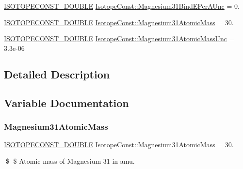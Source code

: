 \begin{DoxyCompactItemize}
\mbox{\hyperlink{group___isotope_const-_macros_ga8f45a7272ce02c0b4c65c44636ed719a}{I\+S\+O\+T\+O\+P\+E\+C\+O\+N\+S\+T\+\_\+\+D\+O\+U\+B\+LE}} \mbox{\hyperlink{group___isotope_const-_magnesium-_mg31_gab2dbe145fb67a4a8c97e870c14deaab0}{Isotope\+Const\+::\+Magnesium31\+Bind\+E\+Per\+A\+Unc}} = 0.
\item 
\mbox{\hyperlink{group___isotope_const-_macros_ga8f45a7272ce02c0b4c65c44636ed719a}{I\+S\+O\+T\+O\+P\+E\+C\+O\+N\+S\+T\+\_\+\+D\+O\+U\+B\+LE}} \mbox{\hyperlink{group___isotope_const-_magnesium-_mg31_ga4aa10e9156cad22509d212337759b763}{Isotope\+Const\+::\+Magnesium31\+Atomic\+Mass}} = 30.
\item 
\mbox{\hyperlink{group___isotope_const-_macros_ga8f45a7272ce02c0b4c65c44636ed719a}{I\+S\+O\+T\+O\+P\+E\+C\+O\+N\+S\+T\+\_\+\+D\+O\+U\+B\+LE}} \mbox{\hyperlink{group___isotope_const-_magnesium-_mg31_ga336638ed01191a0f17a79ea0da5c3f1e}{Isotope\+Const\+::\+Magnesium31\+Atomic\+Mass\+Unc}} = 3.\+3e-\/06
\end{DoxyCompactItemize}


\subsection{Detailed Description}


\subsection{Variable Documentation}
\mbox{\label{group___isotope_const-_magnesium-_mg31_ga4aa10e9156cad22509d212337759b763}} 
\subsubsection{\texorpdfstring{Magnesium31\+Atomic\+Mass}{Magnesium31AtomicMass}}
{\footnotesize\ttfamily \mbox{\hyperlink{group___isotope_const-_macros_ga8f45a7272ce02c0b4c65c44636ed719a}{I\+S\+O\+T\+O\+P\+E\+C\+O\+N\+S\+T\+\_\+\+D\+O\+U\+B\+LE}} Isotope\+Const\+::\+Magnesium31\+Atomic\+Mass = 30.}

\$ \$ Atomic mass of Magnesium-\/31 in amu. \mbox{\label{group___isotope_const-_magnesium-_mg31_ga336638ed01191a0f17a79ea0da5c3f1e}} 
